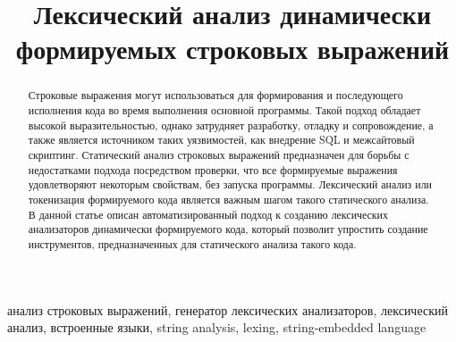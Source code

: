 \documentclass[10pt, conference, compsocconf]{IEEEtran}
\begin{document}
%
\title{Лексический анализ динамически формируемых строковых выражений}

\author{
\and
{}
}

\maketitle


\begin{abstract}
Строковые выражения могут использоваться для формирования и последующего исполнения кода во время выполнения основной программы. Такой подход обладает высокой выразительностью, однако затрудняет разработку, отладку и сопровождение, а также является источником таких уязвимостей, как внедрение SQL и межсайтовый скриптинг. Статический анализ строковых выражений предназначен для борьбы с недостатками подхода посредством проверки, что все формируемые выражения удовлетворяют некоторым свойствам, без запуска программы. Лексический анализ или токенизация формируемого кода является важным шагом такого статического анализа. В данной статье описан автоматизированный подход к созданию лексических анализаторов динамически формируемого кода, который позволит упростить создание инструментов, предназначенных для статического анализа такого кода.
\end{abstract}

\vspace{5 mm}
\begin{IEEEkeywords}
 анализ строковых выражений, генератор лексических анализаторов, лексический анализ, встроенные языки, string analysis, lexing, string-embedded language
\end{IEEEkeywords}

\IEEEpeerreviewmaketitle
\end{document}
